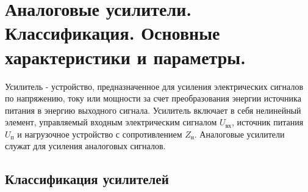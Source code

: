 \documentclass[unicode, 12pt, a4paper, oneside]{article}
\begin{document}
\section{Аналоговые усилители. Классификация. Основные характеристики и параметры.}

Усилитель - устройство, предназначенное для усиления электрических сигналов по напряжению, току или мощности за счет преобразования энергии источника питания в энергию выходного сигнала. Усилитель включает в себя нелинейный элемент, управляемый входным электрическим сигналом $U_\text{вх}$, источник питания $U_\text{п}$ и нагрузочное устройство с сопротивлением $Z_\text{н}$. Аналоговые усилители служат для усиления аналоговых сигналов.

\subsection*{Классификация усилителей}
\end{document}
